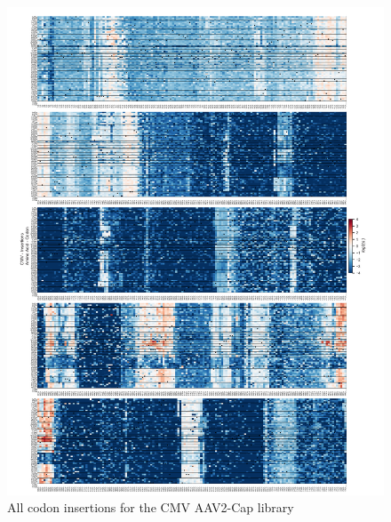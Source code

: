\begin{figure}
\includegraphics[width=\textwidth,height=\textheight]{figures/20180903_AAV2_supp_fig2_CMV_ins.pdf} 
\caption[All codon insertions for the CMV AAV2-Cap  library]{All codon insertions for the CMV AAV2-Cap  library
\label{fig:Figure 7}}
\end{figure}

